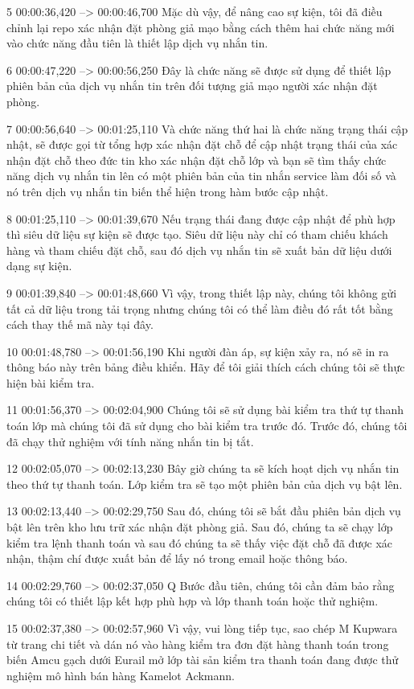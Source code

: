 5
00:00:36,420 --> 00:00:46,700
Mặc dù vậy, để nâng cao sự kiện, tôi đã điều chỉnh lại repo xác nhận đặt phòng giả mạo bằng cách thêm hai chức năng mới vào chức năng đầu tiên là thiết lập dịch vụ nhắn tin.

6
00:00:47,220 --> 00:00:56,250
Đây là chức năng sẽ được sử dụng để thiết lập phiên bản của dịch vụ nhắn tin trên đối tượng giả mạo người xác nhận đặt phòng.

7
00:00:56,640 --> 00:01:25,110
Và chức năng thứ hai là chức năng trạng thái cập nhật, sẽ được gọi từ tổng hợp xác nhận đặt chỗ để cập nhật trạng thái của xác nhận đặt chỗ theo đức tin kho xác nhận đặt chỗ lớp và bạn sẽ tìm thấy chức năng dịch vụ nhắn tin lên có một phiên bản của tin nhắn  service làm đối số và nó trên dịch vụ nhắn tin biến thể hiện trong hàm bước cập nhật.

8
00:01:25,110 --> 00:01:39,670
Nếu trạng thái đang được cập nhật để phù hợp thì siêu dữ liệu sự kiện sẽ được tạo.  Siêu dữ liệu này chỉ có tham chiếu khách hàng và tham chiếu đặt chỗ, sau đó dịch vụ nhắn tin sẽ xuất bản dữ liệu dưới dạng sự kiện.

9
00:01:39,840 --> 00:01:48,660
Vì vậy, trong thiết lập này, chúng tôi không gửi tất cả dữ liệu trong tải trọng nhưng chúng tôi có thể làm điều đó rất tốt bằng cách thay thế mã này tại đây.

10
00:01:48,780 --> 00:01:56,190
Khi người đàn áp, sự kiện xảy ra, nó sẽ in ra thông báo này trên bảng điều khiển.  Hãy để tôi giải thích cách chúng tôi sẽ thực hiện bài kiểm tra.

11
00:01:56,370 --> 00:02:04,900
Chúng tôi sẽ sử dụng bài kiểm tra thứ tự thanh toán lớp mà chúng tôi đã sử dụng cho bài kiểm tra trước đó.  Trước đó, chúng tôi đã chạy thử nghiệm với tính năng nhắn tin bị tắt.

12
00:02:05,070 --> 00:02:13,230
Bây giờ chúng ta sẽ kích hoạt dịch vụ nhắn tin theo thứ tự thanh toán.  Lớp kiểm tra sẽ tạo một phiên bản của dịch vụ bật lên.

13
00:02:13,440 --> 00:02:29,750
Sau đó, chúng tôi sẽ bắt đầu phiên bản dịch vụ bật lên trên kho lưu trữ xác nhận đặt phòng giả.  Sau đó, chúng ta sẽ chạy lớp kiểm tra lệnh thanh toán và sau đó chúng ta sẽ thấy việc đặt chỗ đã được xác nhận, thậm chí được xuất bản để lấy nó trong email hoặc thông báo.

14
00:02:29,760 --> 00:02:37,050
Q Bước đầu tiên, chúng tôi cần đảm bảo rằng chúng tôi có thiết lập kết hợp phù hợp và lớp thanh toán hoặc thử nghiệm.

15
00:02:37,380 --> 00:02:57,960
Vì vậy, vui lòng tiếp tục, sao chép M Kupwara từ trang chi tiết và dán nó vào hàng kiểm tra đơn đặt hàng thanh toán trong biến Amcu gạch dưới Eurail mở lớp tài sản kiểm tra thanh toán đang được thử nghiệm mô hình bán hàng Kamelot Ackmann.

